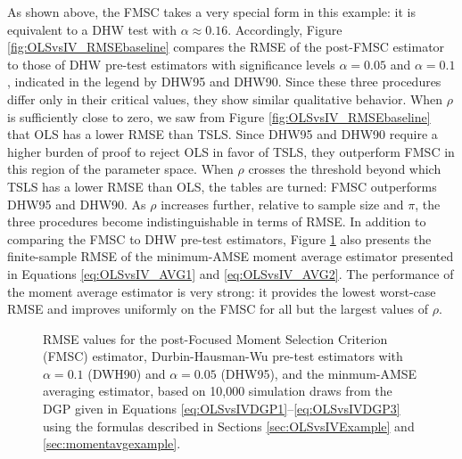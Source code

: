 As shown above, the FMSC takes a very special form in this example: it is equivalent to a DHW test with $\alpha \approx 0.16$.
Accordingly, Figure \ref{fig:OLSvsIV_RMSEbaseline} compares the RMSE of the post-FMSC estimator to those of DHW pre-test estimators with significance levels $\alpha = 0.05$ and $\alpha = 0.1$, indicated in the legend by DHW95 and DHW90.
Since these three procedures differ only in their critical values, they show similar qualitative behavior.
When $\rho$ is sufficiently close to zero, we saw from Figure \ref{fig:OLSvsIV_RMSEbaseline} that OLS has a lower RMSE than TSLS.
Since DHW95 and DHW90 require a higher burden of proof to reject OLS in favor of TSLS, they outperform FMSC in this region of the parameter space.
When $\rho$ crosses the threshold beyond which TSLS has a lower RMSE than OLS, the tables are turned: FMSC outperforms DHW95 and DHW90.
As $\rho$ increases further, relative to sample size and $\pi$, the three procedures become indistinguishable in terms of RMSE.
In addition to comparing the FMSC to DHW pre-test estimators, Figure \ref{fig:OLSvsIV_AVG} also presents the finite-sample RMSE of the minimum-AMSE moment average estimator presented in Equations \ref{eq:OLSvsIV_AVG1} and \ref{eq:OLSvsIV_AVG2}.
The performance of the moment average estimator is very strong: it provides the lowest worst-case RMSE and improves uniformly on the FMSC for all but the largest values of $\rho$.

\begin{figure}
\centering
	
	\caption{RMSE values for the post-Focused Moment Selection Criterion (FMSC) estimator, Durbin-Hausman-Wu pre-test estimators with $\alpha = 0.1$ (DWH90) and $\alpha = 0.05$ (DHW95), and the minmum-AMSE averaging estimator, based on 10,000 simulation draws from the DGP given in Equations \ref{eq:OLSvsIVDGP1}--\ref{eq:OLSvsIVDGP3} using the formulas described in Sections \ref{sec:OLSvsIVExample} and \ref{sec:momentavgexample}.}
	\label{fig:OLSvsIV_AVG}
\end{figure}
